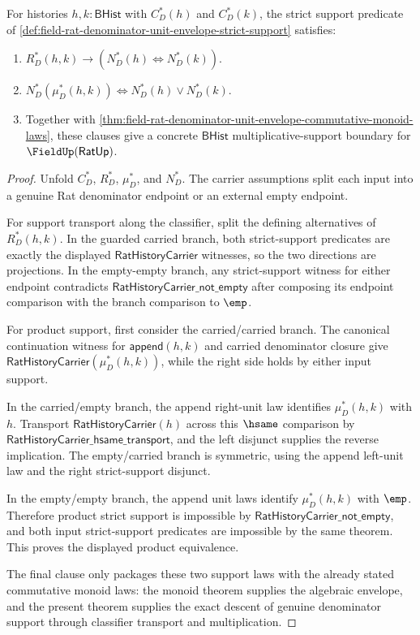 \begin{theorem}
\label{thm:field-rat-denominator-unit-envelope-strict-support-laws}
For histories $h,k:\mathsf{BHist}$ with $C_D^\ast(h)$ and $C_D^\ast(k)$, the
strict support predicate of
\autoref{def:field-rat-denominator-unit-envelope-strict-support} satisfies:
\begin{enumerate}
  \item $R_D^\ast(h,k)\to
  (N_D^\ast(h)\Longleftrightarrow N_D^\ast(k))$.
  \item $N_D^\ast(\mu_D^\ast(h,k))\Longleftrightarrow
  N_D^\ast(h)\lor N_D^\ast(k)$.
  \item Together with
  \autoref{thm:field-rat-denominator-unit-envelope-commutative-monoid-laws},
  these clauses give a concrete $\mathsf{BHist}$ multiplicative-support
  boundary for $\FieldUp(\mathsf{RatUp})$.
\end{enumerate}
\end{theorem}
\begin{proof}
Unfold $C_D^\ast$, $R_D^\ast$, $\mu_D^\ast$, and $N_D^\ast$. The carrier
assumptions split each input into a genuine Rat denominator endpoint or an
external empty endpoint.

For support transport along the classifier, split the defining alternatives of
$R_D^\ast(h,k)$. In the guarded carried branch, both strict-support predicates
are exactly the displayed $\mathsf{RatHistoryCarrier}$ witnesses, so the two
directions are projections. In the empty-empty branch, any strict-support
witness for either endpoint contradicts $\mathsf{RatHistoryCarrier\_not\_empty}$
after composing its endpoint comparison with the branch comparison to $\emp$.

For product support, first consider the carried/carried branch. The canonical
continuation witness for $\mathsf{append}(h,k)$ and carried denominator closure
give $\mathsf{RatHistoryCarrier}(\mu_D^\ast(h,k))$, while the right side holds
by either input support.

In the carried/empty branch, the append right-unit law identifies
$\mu_D^\ast(h,k)$ with $h$. Transport
$\mathsf{RatHistoryCarrier}(h)$ across this $\hsame$ comparison by
$\mathsf{RatHistoryCarrier\_hsame\_transport}$, and the left disjunct supplies
the reverse implication. The empty/carried branch is symmetric, using the
append left-unit law and the right strict-support disjunct.

In the empty/empty branch, the append unit laws identify
$\mu_D^\ast(h,k)$ with $\emp$. Therefore product strict support is impossible
by $\mathsf{RatHistoryCarrier\_not\_empty}$, and both input strict-support
predicates are impossible by the same theorem. This proves the displayed
product equivalence.

The final clause only packages these two support laws with the already stated
commutative monoid laws: the monoid theorem supplies the algebraic envelope,
and the present theorem supplies the exact descent of genuine denominator
support through classifier transport and multiplication.
\end{proof}

